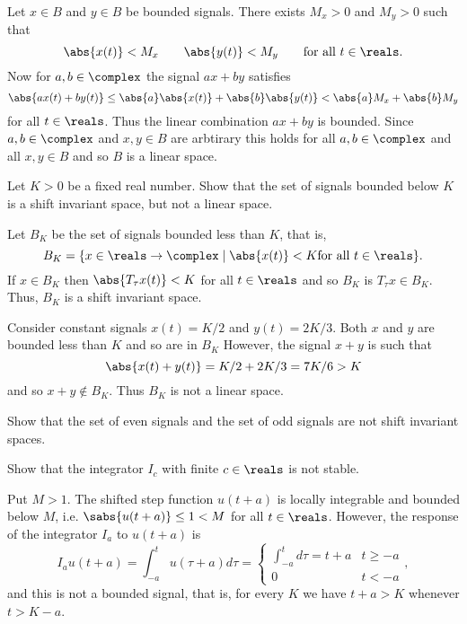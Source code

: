\begin{excersizelist}
\begin{solution}
Let $x \in B$ and $y \in B$ be bounded signals.  There exists $M_x > 0$ and $M_y > 0$ such that
\[
\abs{x(t)} < M_x \qquad \abs{y(t)} < M_y \qquad \text{for all $t \in \reals$}.
\]
Now for $a, b \in \complex$ the signal $ax + by$ satisfies
\[
\abs{ax(t) + by(t)} \leq \abs{a}\abs{x(t)} + \abs{b}\abs{y(t)} < \abs{a} M_x + \abs{b} M_y
\]
for all $t \in \reals$.  Thus the linear combination $ax+by$ is bounded.  Since $a,b \in \complex$ and $x,y \in B$ are arbtirary this holds for all $a,b \in \complex$ and all $x,y \in B$ and so $B$ is a linear space. 
\end{solution}

\item \label{exer:boundconstantnotlinear} Let $K > 0$ be a fixed real number. Show that the set of signals bounded below $K$ is a shift invariant space, but not a linear space. 
\begin{solution}
Let $B_K$ be the set of signals bounded less than $K$, that is,
\[
B_K = \{ x \in \reals \to \complex \mid \abs{x(t)} < K \text{for all $t \in \reals$} \}.
\]
If $x \in B_K$ then $\abs{T_\tau x(t)} < K$ for all $t \in \reals$ and so $B_K$ is $T_\tau x \in B_K$.  Thus, $B_K$ is a shift invariant space.

Consider constant signals $x(t) = K/2$ and $y(t) = 2K/3$. Both $x$ and $y$ are bounded less than $K$ and so are in $B_K$  However, the signal $x + y$ is such that
\[
\abs{x(t) + y(t)} = K/2 + 2K/3 = 7K/6 > K
\]
and so $x + y \notin B_K$.  Thus $B_K$ is not a linear space.
\end{solution} 

\item \label{exer:evenoddnoshiftinvariant} Show that the set of even signals and the set of odd signals are not shift invariant spaces.

\item \label{excer:integratornotstable1} Show that the integrator $I_c$ with finite $c\in\reals$ is not stable.
\begin{solution}
Put $M > 1$.  The shifted step function $u(t + a)$ is locally integrable and bounded below $M$, i.e. $\sabs{u(t+a)} \leq 1 < M$ for all $t \in \reals$.  However, the response of the integrator $I_a$ to $u(t+a)$ is
\[
I_au(t+a) = \int_{-a}^t u(\tau + a)d\tau = \begin{cases}
\int_{-a}^t d\tau = t + a & t \geq -a \\
0 & t < -a 
\end{cases},
\]
and this is not a bounded signal, that is, for every $K$ we have $t + a > K$ whenever $t > K - a$.
\end{solution}


\end{excersizelist}
